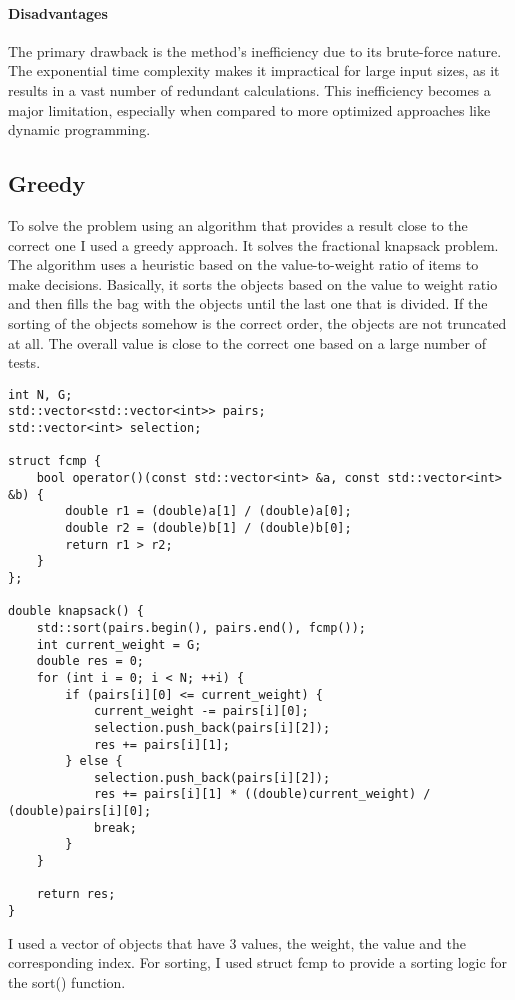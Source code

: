 \documentclass[runningheads]{llncs}
\begin{document}
\paragraph{Disadvantages}
The primary drawback is the method's inefficiency due to its brute-force nature. The exponential 
time complexity makes it impractical for large input sizes, as it results in a vast number of
redundant calculations. This inefficiency becomes a major limitation, especially when compared to
more optimized approaches like dynamic programming.


\subsection{Greedy}

To solve the problem using an algorithm that provides a result close to the correct one I used a
greedy approach. It solves the fractional knapsack problem. The algorithm uses a heuristic based on
the value-to-weight ratio of items to make decisions. Basically, it sorts the objects based on the
value to weight ratio and then fills the bag with the objects until the last one that is divided.
If the sorting of the objects somehow is the correct order, the objects are not truncated at all.
The overall value is close to the correct one based on a large number of tests.

\begin{lstlisting}
int N, G;
std::vector<std::vector<int>> pairs;
std::vector<int> selection;

struct fcmp {
    bool operator()(const std::vector<int> &a, const std::vector<int> &b) {
        double r1 = (double)a[1] / (double)a[0];
        double r2 = (double)b[1] / (double)b[0];
        return r1 > r2;
    }
};

double knapsack() {
    std::sort(pairs.begin(), pairs.end(), fcmp());
    int current_weight = G;
    double res = 0;
    for (int i = 0; i < N; ++i) {
        if (pairs[i][0] <= current_weight) {
            current_weight -= pairs[i][0];
            selection.push_back(pairs[i][2]);
            res += pairs[i][1];
        } else {
            selection.push_back(pairs[i][2]);
            res += pairs[i][1] * ((double)current_weight) / (double)pairs[i][0];
            break;
        }
    }

    return res;
}
\end{lstlisting}

I used a vector of objects that have 3 values, the weight, the value and the corresponding index.
For sorting, I used struct fcmp to provide a sorting logic for the sort() function.
\end{document}
